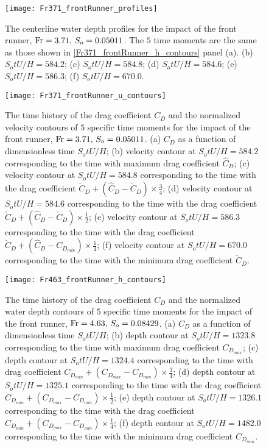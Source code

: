 \documentclass{jfm}
\newcommand{\fr}{{\rm{Fr}}}
\begin{document}
\begin{figure}
	\centerline{\texttt{[image: Fr371\_frontRunner\_profiles]}}
	\caption{The centerline water depth profiles for the impact of the front runner, $\fr=3.71,\,S_o=0.05011$. The $5$ time moments are the same as those shown in \autoref{Fr371_frontRunner_h_contours} panel (a).  (b) $S_otU/H=584.2$; (c) $S_otU/H=584.8$; (d) $S_otU/H=584.6$; (e) $S_otU/H=586.3$; (f) $S_otU/H=670.0$.} 
	\label{Fr371_frontRunner_profiles}
\end{figure}

\begin{figure}
	\centerline{\texttt{[image: Fr371\_frontRunner\_u\_contours]}}
	\caption{The time history of the drag coefficient $C_D$ and the normalized velocity contours of $5$ specific time moments for the impact of the front runner, $\fr=3.71,\,S_o= 0.05011$. (a) $C_D$ as a function of dimensionless time $S_otU/H$; (b) velocity contour at $S_otU/H=584.2$ corresponding to the time with maximum drag coefficient $\hat{C}_{D}$; (c) velocity contour at $S_otU/H=584.8$ corresponding to the time with the  drag coefficient $\check{C}_{D}+(\hat{C}_{D}-\check{C}_{D})\times\frac{3}{4}$; (d) velocity contour at $S_otU/H=584.6$ corresponding to the time with the drag coefficient  $\check{C}_{D}+(\hat{C}_{D}-\check{C}_{D})\times\frac{1}{2}$; (e) velocity contour at $S_otU/H=586.3$ corresponding to the time with the drag coefficient  $\check{C}_{D}+(\hat{C}_{D}-C_{D_{min}})\times\frac{1}{4}$; (f) velocity contour at $S_otU/H=670.0$ corresponding to the time with the minimum drag coefficient  $\check{C}_{D}$.} 
	\label{Fr371_frontRunner_u_contours}
\end{figure}

\begin{figure}
	\centerline{\texttt{[image: Fr463\_frontRunner\_h\_contours]}}
	\caption{The time history of the drag coefficient $C_D$ and the normalized water depth contours of $5$ specific time moments for the impact of the front runner, $\fr=4.63,\,S_o= 0.08429$. (a) $C_D$ as a function of dimensionless time $S_otU/H$; (b) depth contour at $S_otU/H=1323.8$ corresponding to the time with maximum drag coefficient $C_{D_{max}}$; (c) depth contour at $S_otU/H=1324.4$ corresponding to the time with drag coefficient $C_{D_{min}}+(C_{D_{max}}-C_{D_{min}})\times\frac{3}{4}$; (d) depth contour at $S_otU/H=1325.1$ corresponding to the time with the drag coefficient  $C_{D_{min}}+(C_{D_{max}}-C_{D_{min}})\times\frac{1}{2}$; (e) depth contour at $S_otU/H=1326.1$ corresponding to the time with the drag coefficient  $C_{D_{min}}+(C_{D_{max}}-C_{D_{min}})\times\frac{1}{4}$; (f) depth contour at $S_otU/H=1482.0$ corresponding to the time with the minimum drag coefficient  $C_{D_{min}}$.} 
	\label{Fr463_frontRunner_h_contours}
\end{figure}
\end{document}

